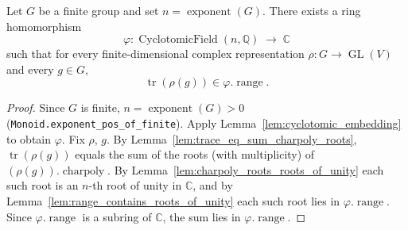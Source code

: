 \begin{theorem}
    \label{thm:brauer_character_in_cyclotomic}
    \leanok
    Let $G$ be a finite group and set $n = \operatorname{exponent}(G)$. There
    exists a ring homomorphism
    \[
        \varphi : \operatorname{CyclotomicField}(n, \mathbb{Q})
            \;\longrightarrow\; \mathbb{C}
    \]
    such that for every finite-dimensional complex representation
    $\rho : G \to \operatorname{GL}(V)$ and every $g \in G$,
    \[
        \operatorname{tr}(\rho(g)) \in \varphi.\operatorname{range}.
    \]
\end{theorem}
\begin{proof}
    Since $G$ is finite, $n = \operatorname{exponent}(G) > 0$
    (\texttt{Monoid.exponent\_pos\_of\_finite}). Apply
    Lemma~\ref{lem:cyclotomic_embedding} to obtain $\varphi$. Fix $\rho$, $g$.
    By Lemma~\ref{lem:trace_eq_sum_charpoly_roots},
    $\operatorname{tr}(\rho(g))$ equals the sum of the roots (with
    multiplicity) of $(\rho(g)).\operatorname{charpoly}$. By
    Lemma~\ref{lem:charpoly_roots_roots_of_unity} each such root is an $n$-th
    root of unity in $\mathbb{C}$, and by
    Lemma~\ref{lem:range_contains_roots_of_unity} each such root lies in
    $\varphi.\operatorname{range}$. Since $\varphi.\operatorname{range}$ is a
    subring of $\mathbb{C}$, the sum lies in $\varphi.\operatorname{range}$.
\end{proof}


